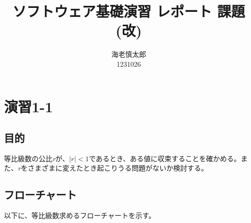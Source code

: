 \documentclass[uplatex,a4paper,12pt,notitlepage]{jsarticle}
\begin{document}
\title{ソフトウェア基礎演習 レポート 課題(改)}
\author{海老慎太郎\\1231026}
\maketitle
\thispagestyle{empty}
\tableofcontents
\vspace{3cm}

\section{演習1-1}
\subsection{目的}
等比級数の公比{\it r}が、\( |r| < 1 \)であるとき、ある値に収束することを確かめる。また、{\it r}をさまざまに変えたとき起こりうる問題がないか検討する。
\subsection{フローチャート}
以下に、等比級数求めるフローチャートを示す。
\end{document}
